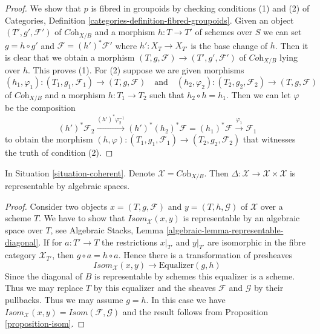 \begin{proof}
We show that $p$ is fibred in groupoids by checking conditions
(1) and (2) of Categories, Definition
\ref{categories-definition-fibred-groupoids}.
Given an object $(T', g', \mathcal{F}')$
of $\textit{Coh}_{X/B}$ and a morphism $h : T \to T'$ of
schemes over $S$ we can set $g = h \circ g'$ and
$\mathcal{F} = (h')^*\mathcal{F}'$ where $h' : X_T \to X_{T'}$
is the base change of $h$. Then it is clear that we obtain
a morphism $(T, g, \mathcal{F}) \to (T', g', \mathcal{F}')$
of $\textit{Coh}_{X/B}$ lying over $h$. This proves (1).
For (2) suppose we are given morphisms
$$
(h_1, \varphi_1) : (T_1, g_1, \mathcal{F}_1) \to (T, g, \mathcal{F})
\quad\text{and}\quad
(h_2, \varphi_2) : (T_2, g_2, \mathcal{F}_2) \to (T, g, \mathcal{F})
$$
of $\textit{Coh}_{X/B}$ and a morphism $h : T_1 \to T_2$ such that
$h_2 \circ h = h_1$. Then we can let $\varphi$ be the composition
$$
(h')^*\mathcal{F}_2
\xrightarrow{(h')^*\varphi_2^{-1}}
(h')^*(h_2)^*\mathcal{F} = (h_1)^*\mathcal{F}
\xrightarrow{\varphi_1}
\mathcal{F}_1
$$
to obtain the morphism
$(h, \varphi) : (T_1, g_1, \mathcal{F}_1) \to (T_2, g_2, \mathcal{F}_2)$
that witnesses the truth of condition (2).
\end{proof}

\begin{lemma}
\label{lemma-coherent-diagonal}
In Situation \ref{situation-coherent}. Denote
$\mathcal{X} = \textit{Coh}_{X/B}$. Then
$\Delta : \mathcal{X} \to \mathcal{X} \times \mathcal{X}$ is
representable by algebraic spaces.
\end{lemma}

\begin{proof}
Consider two objects $x = (T, g, \mathcal{F})$ and $y = (T, h, \mathcal{G})$
of $\mathcal{X}$ over a scheme $T$. We have to show that
$\mathit{Isom}_\mathcal{X}(x, y)$ is representable by an algebraic
space over $T$, see
Algebraic Stacks, Lemma \ref{algebraic-lemma-representable-diagonal}.
If for $a : T' \to T$ the restrictions $x|_{T'}$ and $y|_{T'}$ are isomorphic
in the fibre category $\mathcal{X}_{T'}$, then $g \circ a = h \circ a$.
Hence there is a transformation of presheaves
$$
\mathit{Isom}_\mathcal{X}(x, y) \longrightarrow \text{Equalizer}(g, h)
$$
Since the diagonal of $B$ is representable by schemes this equalizer is
a scheme. Thus we may replace $T$ by this equalizer and the sheaves
$\mathcal{F}$ and $\mathcal{G}$ by their pullbacks. Thus we may assume
$g = h$. In this case we have
$\mathit{Isom}_\mathcal{X}(x, y) = \mathit{Isom}(\mathcal{F}, \mathcal{G})$
and the result follows from Proposition \ref{proposition-isom}.
\end{proof}

